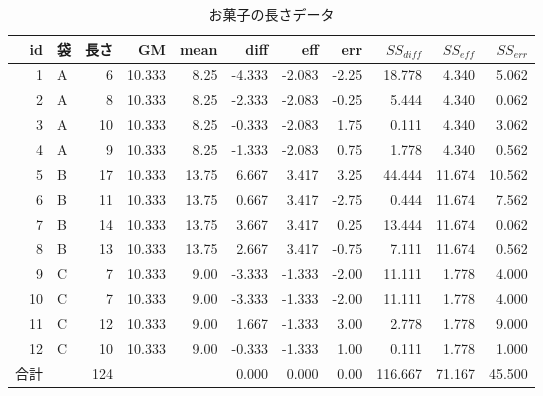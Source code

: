 \begin{table}[ht]
	\centering
	\caption{お菓子の長さデータ}
	\begin{tabular}[t]{rlrrrrrrrrr}
		id & 袋 & 長さ  & GM     & mean  & diff   & eff    & err   & $SS_{diff}$ & $SS_{eff}$ & $SS_{err}$ \\\hline\hline
		1  & A & 6   & 10.333 & 8.25  & -4.333 & -2.083 & -2.25 & 18.778      & 4.340      & 5.062      \\
		2  & A & 8   & 10.333 & 8.25  & -2.333 & -2.083 & -0.25 & 5.444       & 4.340      & 0.062      \\
		3  & A & 10  & 10.333 & 8.25  & -0.333 & -2.083 & 1.75  & 0.111       & 4.340      & 3.062      \\
		4  & A & 9   & 10.333 & 8.25  & -1.333 & -2.083 & 0.75  & 1.778       & 4.340      & 0.562      \\
		5  & B & 17  & 10.333 & 13.75 & 6.667  & 3.417  & 3.25  & 44.444      & 11.674     & 10.562     \\
		6  & B & 11  & 10.333 & 13.75 & 0.667  & 3.417  & -2.75 & 0.444       & 11.674     & 7.562      \\
		7  & B & 14  & 10.333 & 13.75 & 3.667  & 3.417  & 0.25  & 13.444      & 11.674     & 0.062      \\
		8  & B & 13  & 10.333 & 13.75 & 2.667  & 3.417  & -0.75 & 7.111       & 11.674     & 0.562      \\
		9  & C & 7   & 10.333 & 9.00  & -3.333 & -1.333 & -2.00 & 11.111      & 1.778      & 4.000      \\
		10 & C & 7   & 10.333 & 9.00  & -3.333 & -1.333 & -2.00 & 11.111      & 1.778      & 4.000      \\
		11 & C & 12  & 10.333 & 9.00  & 1.667  & -1.333 & 3.00  & 2.778       & 1.778      & 9.000      \\
		12 & C & 10  & 10.333 & 9.00  & -0.333 & -1.333 & 1.00  & 0.111       & 1.778      & 1.000      \\\hline
		合計 &   & 124 &        &       & 0.000  & 0.000  & 0.00  & 116.667     & 71.167     & 45.500     \\\hline
	\end{tabular}
	\label{anovaExample1}
\end{table}
